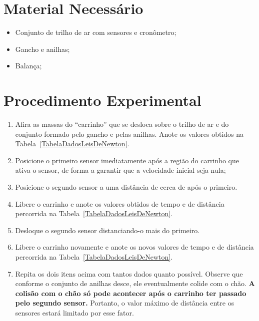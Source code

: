 \section{Material Necessário}

\begin{itemize}
	\item Conjunto de trilho de ar com sensores e cronômetro;
	\item Gancho e anilhas;
	\item Balança;
\end{itemize}

\section{Procedimento Experimental}

\begin{enumerate}
	\item Afira as massas do ``carrinho'' que se desloca sobre o trilho de ar e do conjunto formado pelo gancho e pelas anilhas. Anote os valores obtidos na Tabela~\ref{TabelaDadosLeisDeNewton}.
	\item Posicione o primeiro sensor imediatamente após a região do carrinho que ativa o sensor, de forma a garantir que a velocidade inicial seja nula;
	\item Posicione o segundo sensor a uma distância de cerca de  após o primeiro.
	\item Libere o carrinho e anote os valores obtidos de tempo e de distância percorrida na Tabela~\ref{TabelaDadosLeisDeNewton}.
	\item Desloque o segundo sensor distanciando-o mais  do primeiro.
	\item Libere o carrinho novamente e anote os novos valores de tempo e de distância percorrida na Tabela~\ref{TabelaDadosLeisDeNewton}.
	\item Repita os dois itens acima com tantos dados quanto possível. Observe que conforme o conjunto de anilhas desce, ele eventualmente colide com o chão. \textbf{A colisão com o chão só pode acontecer após o carrinho ter passado pelo segundo sensor.} Portanto, o valor máximo de distância entre os sensores estará limitado por esse fator. 
\end{enumerate}

